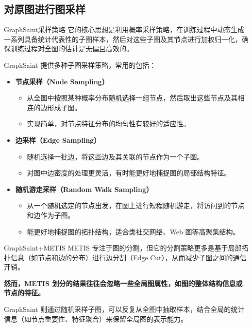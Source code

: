 \documentclass[UTF8, aspectratio=169,10pt]{beamer}%
\numberwithin{equation}{section}
\numberwithin{figure}{section}
\numberwithin{table}{section}
\theoremstyle{definition}
\begin{document}
\subsection{对原图进行图采样}
\begin{frame}{GraphSaint采样策略}
	它的核心思想是利用概率采样策略，在训练过程中动态生成一系列具备统计代表性的子图样本，然后对这些子图及其节点进行加权归一化，确保训练过程对全图的估计是无偏且高效的。\par
	GraphSaint 提供多种子图采样策略，常用的包括：
	\begin{itemize}
		\item \textbf{节点采样（Node Sampling）}
		\begin{itemize}
			\item 从全图中按照某种概率分布随机选择一组节点，然后取出这些节点及其相连的边形成子图。
			\item 实现简单，对节点特征分布的均匀性有较好的适应性。
		\end{itemize}
		
		\item \textbf{边采样（Edge Sampling）}
		\begin{itemize}
			\item 随机选择一批边，将这些边及其关联的节点作为一个子图。
			\item 对图中边密度的处理更灵活，有时能更好地捕捉图的局部结构特征。
		\end{itemize}
		
		\item \textbf{随机游走采样（Random Walk Sampling）}
		\begin{itemize}
			\item 从一个随机选定的节点出发，在图上进行短程随机游走，将访问到的节点和边作为子图。
			\item 能更好地捕捉图的拓扑结构，适合类社交网络、Web 图等高聚集结构。
		\end{itemize}
	\end{itemize}
\end{frame}




\begin{frame}{GraphSaint+METIS}
METIS 专注于图的分割，但它的分割策略更多是基于局部拓扑信息（如节点和边的分布）进行边分割（Edge Cut），从而减少子图之间的通信开销。\par
\textbf{然而，METIS 划分的结果往往会忽略一些全局图属性，如图的整体结构信息或节点的特征。}\par
GraphSaint 则通过随机采样子图，可以反复从全图中抽取样本，结合全局的统计信息（如节点重要性、特征聚合）来保留全局图的表示能力。

	
\end{frame}
\end{document}
